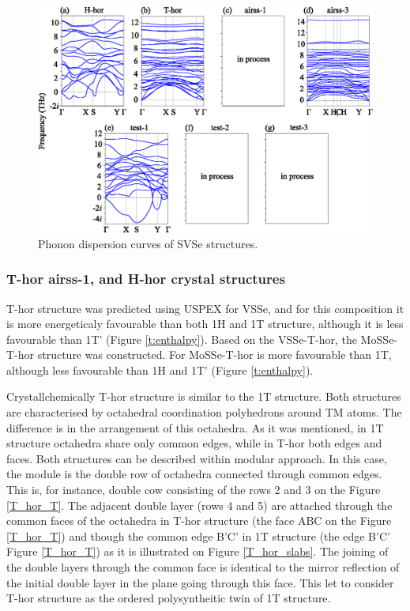 \documentclass[a4paperm]{article}
\begin{document}
\begin{figure}[H]
	\includegraphics[width=\textwidth]{phon_svse.eps}
	\caption{Phonon dispersion curves of SVSe structures. }
	\label{phon_svse}
\end{figure}

\subsubsection{T-hor airss-1, and H-hor crystal structures}
T-hor structure was predicted using USPEX for VSSe, and for this composition it is more  energeticaly favourable than both 1H and 1T structure, although it is less favourable than 1T' (Figure \ref{t:enthalpy}).
Based on the VSSe-T-hor, the MoSSe-T-hor structure was constructed.
For MoSSe-T-hor is more favourable than 1T, although less favourable than 1H and 1T' (Figure \ref{t:enthalpy}).

Crystallchemically T-hor structure is similar to the 1T structure.
Both structures are characterised by octahedral coordination polyhedrons around TM atoms.
The difference is in the arrangement of this octahedra.
As it was mentioned, in 1T structure octahedra share only common edges, while in T-hor both edges and faces.
Both structures can be described within modular approach.
In this case, the module is the double row of octahedra connected through common edges.
This is, for instance, double cow consisting of the rows 2 and 3 on the Figure \ref{T_hor_T}.
The adjacent double layer (rows 4 and 5) are attached through the common faces  of the octahedra in T-hor structure (the face ABC on the Figure \ref{T_hor_T}) and though the common edge B'C' in 1T structure (the edge B'C' Figure \ref{T_hor_T}) as it is illustrated on Figure \ref{T_hor_slabs}.
The joining of the double layers through the common face is identical to the mirror reflection of the initial double layer in the plane going through this face.
This let to consider T-hor structure as the ordered polysyntheitic twin of 1T structure.
\end{document}
